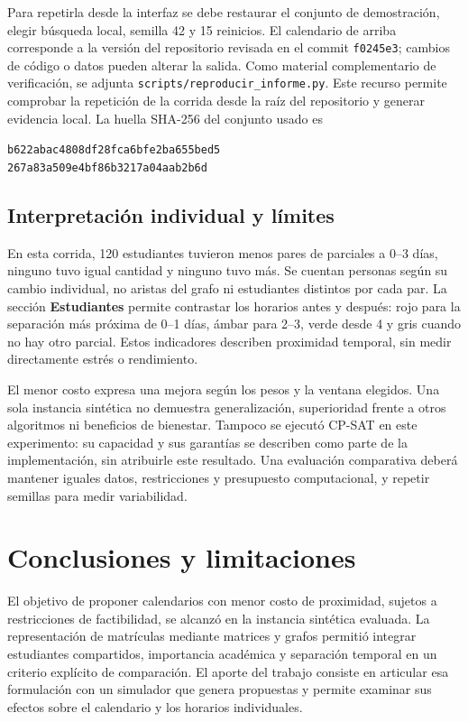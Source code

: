 \documentclass[conference]{IEEEtran}
\begin{document}
Para repetirla desde la interfaz se debe restaurar el conjunto de demostración, elegir búsqueda local, semilla 42 y 15 reinicios. El calendario de arriba corresponde a la versión del repositorio revisada en el commit \texttt{f0245e3}; cambios de código o datos pueden alterar la salida. Como material complementario de verificación, se adjunta \texttt{scripts/reproducir\_informe.py}. Este recurso permite comprobar la repetición de la corrida desde la raíz del repositorio y generar evidencia local. La huella SHA-256 del conjunto usado es
\begin{center}\begin{minipage}{\linewidth}\centering\footnotesize\texttt{b622abac4808df28fca6bfe2ba655bed5}\\
\texttt{267a83a509e4bf86b3217a04aab2b6d}\end{minipage}\end{center}

\subsection{Interpretación individual y límites}
En esta corrida, 120 estudiantes tuvieron menos pares de parciales a 0--3 días, ninguno tuvo igual cantidad y ninguno tuvo más. Se cuentan personas según su cambio individual, no aristas del grafo ni estudiantes distintos por cada par. La sección \textbf{Estudiantes} permite contrastar los horarios antes y después: rojo para la separación más próxima de 0--1 días, ámbar para 2--3, verde desde 4 y gris cuando no hay otro parcial. Estos indicadores describen proximidad temporal, sin medir directamente estrés o rendimiento.

El menor costo expresa una mejora según los pesos y la ventana elegidos. Una sola instancia sintética no demuestra generalización, superioridad frente a otros algoritmos ni beneficios de bienestar. Tampoco se ejecutó CP-SAT en este experimento: su capacidad y sus garantías se describen como parte de la implementación, sin atribuirle este resultado. Una evaluación comparativa deberá mantener iguales datos, restricciones y presupuesto computacional, y repetir semillas para medir variabilidad.

\section{Conclusiones y limitaciones}
El objetivo de proponer calendarios con menor costo de proximidad, sujetos a restricciones de factibilidad, se alcanzó en la instancia sintética evaluada. La representación de matrículas mediante matrices y grafos permitió integrar estudiantes compartidos, importancia académica y separación temporal en un criterio explícito de comparación. El aporte del trabajo consiste en articular esa formulación con un simulador que genera propuestas y permite examinar sus efectos sobre el calendario y los horarios individuales.
\end{document}
